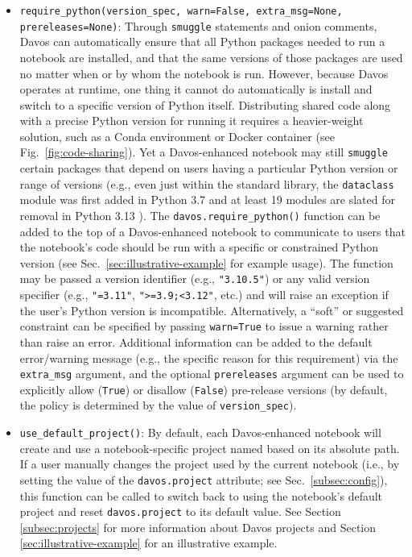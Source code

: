 \documentclass[preprint,12pt,a4paper]{elsarticle}
\begin{document}
\begin{itemize}
\item \texttt{require\_python(version\_spec, warn=False, extra\_msg=None, prereleases=None)}: Through \texttt{smuggle} statements and onion comments, Davos can automatically ensure that all Python packages needed to run a notebook are installed, and that the same versions of those packages are used no matter when or by whom the notebook is run.
  However, because Davos operates at runtime, one thing it cannot do automatically is install and switch to a specific version of Python itself.
  Distributing shared code along with a precise Python version for running it requires a heavier-weight solution, such as a Conda environment or Docker container (see Fig.~\ref{fig:code-sharing}).
  Yet a Davos-enhanced notebook may still \texttt{smuggle} certain packages that depend on users having a particular Python version or range of versions (e.g., even just within the standard library, the \texttt{dataclass} module was first added in Python 3.7 \cite{Smit17} and at least 19 modules are slated for removal in Python 3.13 \cite{HeimCann19}).
  The \texttt{davos.require\_python()} function can be added to the top of a Davos-enhanced notebook to communicate to users that the notebook's code should be run with a specific or constrained Python version (see Sec.~\ref{sec:illustrative-example} for example usage).
  The function may be passed a version identifier (e.g., \texttt{"3.10.5"}) or any valid version specifier \cite{CoghStuf13} (e.g., \texttt{"\raisebox{0.5ex}{\texttildelow}=3.11"}, \texttt{">=3.9;<3.12"}, etc.) and will raise an exception if the user's Python version is incompatible.
  Alternatively, a ``soft'' or suggested constraint can be specified by passing \texttt{warn=True} to issue a warning rather than raise an error.
  Additional information can be added to the default error/warning message (e.g., the specific reason for this requirement) via the \texttt{extra\_msg} argument, and the optional \texttt{prereleases} argument can be used to explicitly allow (\texttt{True}) or disallow (\texttt{False}) pre-release versions (by default, the policy is determined by the value of \texttt{version\_spec}).

\item \texttt{use\_default\_project()}: By default, each Davos-enhanced notebook will create and use a notebook-specific project named based on its absolute path.
  If a user manually changes the project used by the current notebook (i.e., by setting the value of the \texttt{davos.project} attribute; see Sec.~\ref{subsec:config}), this function can be called to switch back to using the notebook's default project and reset \texttt{davos.project} to its default value.
  See Section \ref{subsec:projects} for more information about Davos projects and Section \ref{sec:illustrative-example} for an illustrative example.

\end{itemize}
\end{document}
